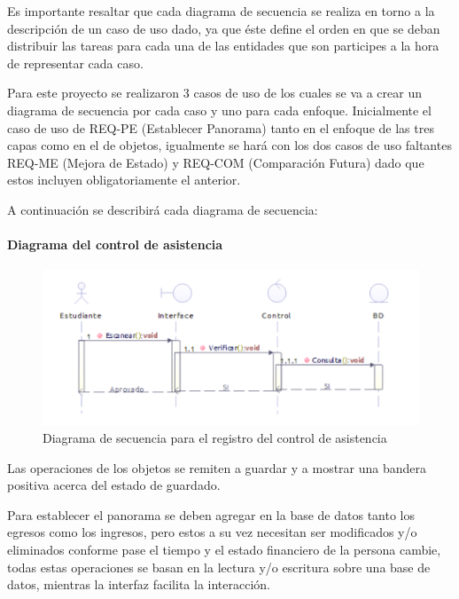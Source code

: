 Es importante resaltar que cada diagrama de secuencia se realiza en torno a la descripción de un caso de uso dado, ya que éste define el orden en que se deban distribuir las tareas para cada una de las entidades que son participes a la hora de representar cada caso.

Para este proyecto se realizaron 3 casos de uso de los cuales se va a crear un diagrama de secuencia por cada caso y uno para cada enfoque. Inicialmente el caso de uso de REQ-PE (Establecer Panorama) tanto en el enfoque de las tres capas como en el de objetos, igualmente se hará con los dos casos de uso faltantes REQ-ME (Mejora de Estado) y REQ-COM (Comparación Futura) dado que estos incluyen obligatoriamente el anterior.

A continuación se describirá cada diagrama de secuencia:

\paragraph{Diagrama del control de asistencia}

\begin{figure}[H]
	\centering
	\includegraphics[width=1\linewidth]{parte2/imgs/DiagramaSecuencia/Asistencia}
	\caption[Diagrama de secuencia de registro de Asistencia]{Diagrama de secuencia para el registro del control de asistencia}
	\label{fig:diagramadesecuencia1}
\end{figure}

Las operaciones de los objetos se remiten a guardar y a mostrar una bandera positiva acerca del estado de guardado.

Para establecer el panorama se deben agregar en la base de datos tanto los egresos como los ingresos, pero estos a su vez necesitan ser modificados y/o eliminados conforme pase el tiempo y el estado financiero de la persona cambie, todas estas operaciones se basan en la lectura y/o escritura sobre una base de datos, mientras la interfaz facilita la interacción.

